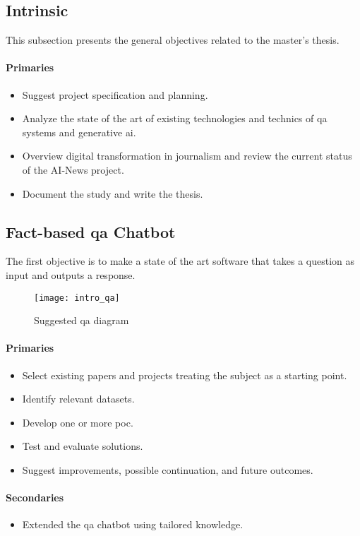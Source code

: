 \subsection{Intrinsic}
This subsection presents the general objectives related to the master's thesis.
\paragraph{Primaries}
\begin{itemize}[noitemsep]
    \item Suggest project specification and planning.
    \item Analyze the state of the art of existing technologies and technics of \gls{qa} systems and generative \gls{ai}.
    \item Overview digital transformation in journalism and review the current status of the AI-News project.
    \item Document the study and write the thesis.
\end{itemize}

\subsection{Fact-based \gls{qa} Chatbot}
The first objective is to make a state of the art software that takes a question as input and outputs a response.
\begin{figure}[ht!]
    \centering
    \texttt{[image: intro\_qa]}
    \caption{Suggested \gls{qa} diagram}
    \label{fig:intro_qa}
\end{figure}

\paragraph{Primaries}
\begin{itemize}[noitemsep]
    \item Select existing papers and projects treating the subject as a starting point.
    \item Identify relevant datasets.
    \item Develop one or more \gls{poc}.
    \item Test and evaluate solutions.
    \item Suggest improvements, possible continuation, and future outcomes.
\end{itemize}
\paragraph{Secondaries}
\begin{itemize}[noitemsep]
    \item Extended the \gls{qa} chatbot using tailored knowledge.
\end{itemize}

